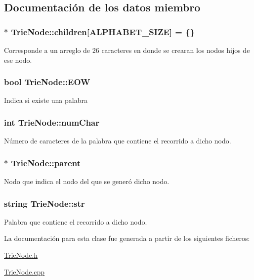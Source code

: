 \subsection{Documentación de los datos miembro}
\hypertarget{class_trie_node_a3e37dd20032584eedaa6f45fda2b9698}{
\subsubsection[{children}]{$\ast$ Trie\-Node\-::children\mbox{[}A\-L\-P\-H\-A\-B\-E\-T\-\_\-\-S\-I\-Z\-E\mbox{]} = \{\}}}\label{class_trie_node_a3e37dd20032584eedaa6f45fda2b9698}
Corresponde a un arreglo de 26 caracteres en donde se crearan los nodos hijos de ese nodo. \hypertarget{class_trie_node_aeb4c2795d110df8c1fee5b494051e56d}{
\subsubsection[{E\-O\-W}]{\setlength{\rightskip}{0pt plus 5cm}bool Trie\-Node\-::\-E\-O\-W}}\label{class_trie_node_aeb4c2795d110df8c1fee5b494051e56d}
Indica si existe una palabra \hypertarget{class_trie_node_ae4cc4f53f8e5e06de5f460f6e8bbe0bb}{
\subsubsection[{num\-Char}]{\setlength{\rightskip}{0pt plus 5cm}int Trie\-Node\-::num\-Char}}\label{class_trie_node_ae4cc4f53f8e5e06de5f460f6e8bbe0bb}
Número de caracteres de la palabra que contiene el recorrido a dicho nodo. \hypertarget{class_trie_node_a523e346979214a75557e582fef02b3fd}{
\subsubsection[{parent}]{$\ast$ Trie\-Node\-::parent}}\label{class_trie_node_a523e346979214a75557e582fef02b3fd}
Nodo que indica el nodo del que se generó dicho nodo. \hypertarget{class_trie_node_aa5fbf2d2487f8d1f3eecee4e8b999a16}{
\subsubsection[{str}]{\setlength{\rightskip}{0pt plus 5cm}string Trie\-Node\-::str}}\label{class_trie_node_aa5fbf2d2487f8d1f3eecee4e8b999a16}
Palabra que contiene el recorrido a dicho nodo. 

La documentación para esta clase fue generada a partir de los siguientes ficheros\-:\begin{DoxyCompactItemize}
\item 
\hyperlink{_trie_node_8h}{Trie\-Node.\-h}\item 
\hyperlink{_trie_node_8cpp}{Trie\-Node.\-cpp}\end{DoxyCompactItemize}
